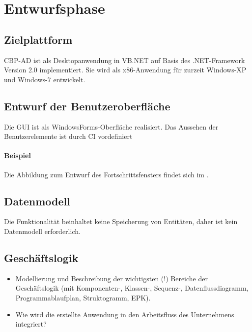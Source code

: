 
\section{Entwurfsphase} 
\label{sec:Entwurfsphase}

\subsection{Zielplattform}
\label{sec:Zielplattform}

\ac{CBP-AD} ist als Desktopanwendung in \acs{VB}.NET auf Basis des .NET-Framework Version 2.0 implementiert.
Sie wird als x86-Anwendung für zurzeit Windows-XP und Windows-7 entwickelt.


\subsection{Entwurf der Benutzeroberfläche}
\label{sec:Benutzeroberflaeche}

Die \acs{GUI} ist als WindowsForms-Oberfläche realisiert. Das Aussehen der Benutzerelemente ist durch \ac{CI} vordefiniert

\paragraph{Beispiel}
Die Abbildung zum Entwurf des Fortschrittsfensters findet sich im . 

\subsection{Datenmodell}
\label{sec:Datenmodell}

Die Funktionalität \gqq{\titel} beinhaltet keine Speicherung von Entitäten, daher ist kein Datenmodell erforderlich.


\subsection{Geschäftslogik}
\label{sec:Geschaeftslogik}

\begin{itemize}
	\item Modellierung und Beschreibung der wichtigsten (!) Bereiche der Geschäftslogik (\zB mit Kom\-po\-nen\-ten-, Klassen-, Sequenz-, Datenflussdiagramm, Programmablaufplan, Struktogramm, \ac{EPK}).
	\item Wie wird die erstellte Anwendung in den Arbeitsfluss des Unternehmens integriert?
\end{itemize}


